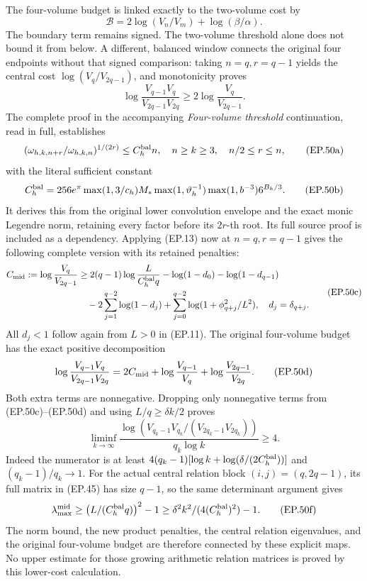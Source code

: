 The four-volume budget is linked exactly to the two-volume cost by
\[
 \mathcal B=2\log(V_n/V_m)+\log(\beta/\alpha).\tag{EP.49}
\]
The boundary term remains signed. The two-volume threshold alone
does not bound it from below. A different, balanced window connects
the original four endpoints without that signed comparison: taking
$n=q,r=q-1$ yields the central cost $\log(V_q/V_{2q-1})$, and
monotonicity proves
\[
 \log\frac{V_{q-1}V_q}{V_{2q-1}V_{2q}}
 \ge2\log\frac{V_q}{V_{2q-1}}.\tag{EP.50}
\]
The complete proof in the accompanying \emph{Four-volume threshold}
continuation, read in full, establishes
\[
 (\omega_{h,k,n+r}/\omega_{h,k,n})^{1/(2r)}\le C_h^{\rm bal}n,
 \quad n\ge k\ge3,\quad n/2\le r\le n,
\tag{EP.50a}
\]
with the literal sufficient constant
\[
 C_h^{\rm bal}=256e^\pi\max(1,3/c_h)M_*
 \max(1,\vartheta_h^{-1})\max(1,b^{-3})6^{B_h/3}.
\tag{EP.50b}
\]
It derives this from the original lower convolution envelope and
the exact monic Legendre norm, retaining every factor before its
$2r$-th root. Its full source proof is included as a dependency.
Applying (EP.13) now at $n=q,r=q-1$ gives the following complete
version with its retained penalties:
\[
 \begin{split}
 C_{\rm mid}:=\log\frac{V_q}{V_{2q-1}}
 &\ge2(q-1)\log\frac{L}{C_h^{\rm bal}q}
 -\log(1-d_0)-\log(1-d_{q-1})\\
 &\quad-2\sum_{j=1}^{q-2}\log(1-d_j)
 +\sum_{j=0}^{q-2}\log(1+\phi_{q+j}^2/L^2),
 \quad d_j=\delta_{q+j}.
 \end{split}\tag{EP.50c}
\]
All $d_j<1$ follow again from $L>0$ in (EP.11). The original
four-volume budget has the exact positive decomposition
\[
 \log\frac{V_{q-1}V_q}{V_{2q-1}V_{2q}}
 =2C_{\rm mid}+\log\frac{V_{q-1}}{V_q}
                 +\log\frac{V_{2q-1}}{V_{2q}}.
\tag{EP.50d}
\]
Both extra terms are nonnegative. Dropping only nonnegative terms
from (EP.50c)--(EP.50d) and using $L/q\ge\delta k/2$ proves
\[
 \boxed{\liminf_{k\to\infty}
 \frac{\log(V_{q_k-1}V_{q_k}/(V_{2q_k-1}V_{2q_k}))}
 {q_k\log k}\ge4.}\tag{EP.50e}
\]
Indeed the numerator is at least
$4(q_k-1)[\log k+\log(\delta/(2C_h^{\rm bal}))]$ and
$(q_k-1)/q_k\to1$. For the actual central relation block
$(i,j)=(q,2q-1)$, its full matrix in (EP.45) has size $q-1$,
so the same determinant argument gives
\[
 \lambda_{\max}^{\rm mid}\ge
 \left(L/(C_h^{\rm bal}q)\right)^2-1
 \ge\delta^2k^2/(4(C_h^{\rm bal})^2)-1.\tag{EP.50f}
\]
The norm bound, the new product penalties, the central relation
eigenvalues, and the original four-volume budget are therefore
connected by these explicit maps. No upper estimate for those
growing arithmetic relation matrices is proved by this lower-cost
calculation.

